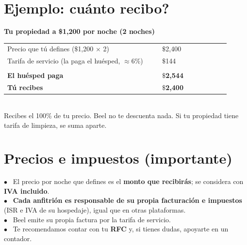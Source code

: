 \documentclass[11pt]{article}
\begin{document}
\section{Ejemplo: \textquestiondown{}cuánto recibo?}
\begin{tcolorbox}[enhanced, colback=white, colframe=beelgreen, arc=8pt,
  boxrule=1.2pt, width=\linewidth, top=7pt, bottom=7pt, left=12pt, right=12pt]
  {\color{beelgreendark}\bfseries Tu propiedad a \$1,200 por noche (2 noches)}\\[4pt]
  \begin{tabular}{@{}p{0.64\linewidth}>{\raggedleft\arraybackslash}p{0.28\linewidth}@{}}
  Precio que tú defines ($\$$1,200 $\times$ 2) & $\$$2,400 \\
  Tarifa de servicio (la paga el huésped, $\approx$6\%) & $\$$144 \\[2pt]
  \hline\\[-7pt]
  {\bfseries El huésped paga} & {\bfseries $\$$2,544} \\
  {\color{beelgreen}\bfseries Tú recibes} & {\color{beelgreen}\bfseries $\$$2,400} \\
  \end{tabular}\\[3pt]
  {\color{beelgray}\small Recibes el 100\% de tu precio. Beel no te descuenta nada.
  Si tu propiedad tiene tarifa de limpieza, se suma aparte.}
\end{tcolorbox}

\section{Precios e impuestos (importante)}
\begin{tcolorbox}[enhanced, colback=beelsand, colframe=beelsand, arc=6pt,
  boxrule=0pt, left=10pt, right=10pt, top=7pt, bottom=7pt]
\small
$\bullet$~ El precio por noche que defines es el \textbf{monto que recibirás}; se
considera con \textbf{IVA incluido}.\\[2pt]
$\bullet$~ \textbf{Cada anfitrión es responsable de su propia facturación e
impuestos} (ISR e IVA de su hospedaje), igual que en otras plataformas.\\[2pt]
$\bullet$~ Beel emite su propia factura por la tarifa de servicio.\\[2pt]
$\bullet$~ Te recomendamos contar con tu \textbf{RFC} y, si tienes dudas,
apoyarte en un contador.
\end{tcolorbox}
\end{document}
